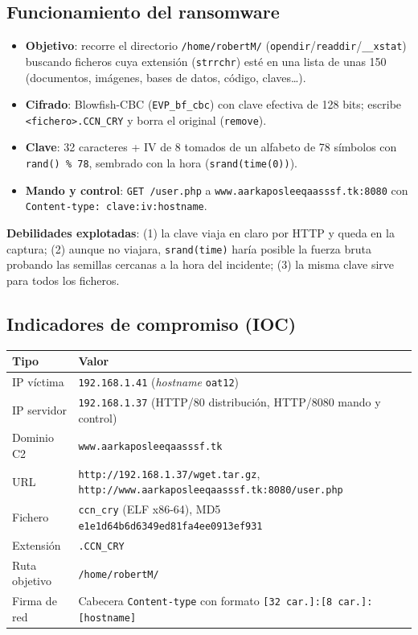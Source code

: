 \documentclass[11pt,a4paper]{article}
\begin{document}
\subsection{Funcionamiento del ransomware}
\begin{itemize}
  \item \textbf{Objetivo}: recorre el directorio \texttt{/home/robertM/} (\texttt{opendir}/\texttt{readdir}/\texttt{\_\_xstat})
        buscando ficheros cuya extensión (\texttt{strrchr}) esté en una lista de unas 150 (documentos, imágenes,
        bases de datos, código, claves\dots).
  \item \textbf{Cifrado}: Blowfish-CBC (\texttt{EVP\_bf\_cbc}) con clave efectiva de 128 bits; escribe
        \texttt{<fichero>.CCN\_CRY} y borra el original (\texttt{remove}).
  \item \textbf{Clave}: 32 caracteres + IV de 8 tomados de un alfabeto de 78 símbolos con \texttt{rand() \% 78},
        sembrado con la hora (\texttt{srand(time(0))}).
  \item \textbf{Mando y control}: \texttt{GET /user.php} a \texttt{www.aarkaposleeqaasssf.tk:8080} con
        \texttt{Content-type: clave:iv:hostname}.
\end{itemize}

\textbf{Debilidades explotadas}: (1) la clave viaja en claro por HTTP y queda en la captura; (2) aunque no viajara,
\texttt{srand(time)} haría posible la fuerza bruta probando las semillas cercanas a la hora del incidente; (3) la
misma clave sirve para todos los ficheros.

\subsection{Indicadores de compromiso (IOC)}
\begin{tabularx}{\linewidth}{@{}lX@{}}
\toprule
\textbf{Tipo} & \textbf{Valor} \\ \midrule
IP víctima & \texttt{192.168.1.41} (\emph{hostname} \texttt{oat12}) \\
IP servidor & \texttt{192.168.1.37} (HTTP/80 distribución, HTTP/8080 mando y control) \\
Dominio C2 & \texttt{www.aarkaposleeqaasssf.tk} \\
URL & \nolinkurl{http://192.168.1.37/wget.tar.gz}, \nolinkurl{http://www.aarkaposleeqaasssf.tk:8080/user.php} \\
Fichero & \texttt{ccn\_cry} (ELF x86-64), MD5 \texttt{e1e1d64b6d6349ed81fa4ee0913ef931} \\
Extensión & \texttt{.CCN\_CRY} \\
Ruta objetivo & \texttt{/home/robertM/} \\
Firma de red & Cabecera \texttt{Content-type} con formato \texttt{[32 car.]:[8 car.]:[hostname]} \\
\bottomrule
\end{tabularx}
\end{document}
